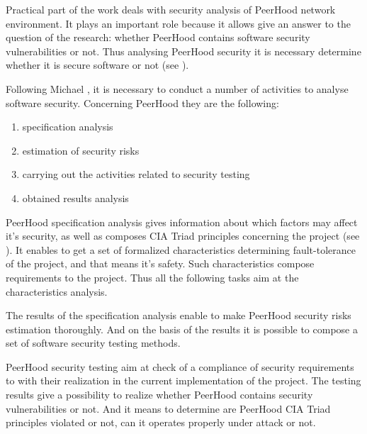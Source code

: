 %
Practical part of the work deals with security analysis of \The PeerHood network environment. 
%
It plays an important role because it allows give an answer to the question of the research: whether PeerHood contains software security vulnerabilities or not. 
%
Thus analysing PeerHood security it is necessary determine whether it is secure software or not (see ). 

%
Following Michael , it is necessary to conduct a number of activities to analyse software security. 
%
Concerning PeerHood they are the following: 
\begin{enumerate}
	\leftskip2em%
	\setlength{\itemsep}{0pt}%
	\setlength{\parsep}{0pt}%

	\item specification analysis
	\item estimation of security risks
	\item carrying out the activities related to security testing
	\item obtained results analysis
\end{enumerate}

%
PeerHood specification analysis gives information about which factors may affect it's security, as well as composes CIA Triad principles concerning the project (see ). 
%
It enables to get a set of formalized characteristics determining fault-tolerance of the project, and that means it's safety. 
%
Such characteristics compose requirements to the project. 
%
Thus all the following tasks aim at the characteristics analysis. 

%
The results of the specification analysis enable to make PeerHood security risks estimation thoroughly. 
%
And on the basis of the results it is possible to compose a set of software security testing methods. 

%
PeerHood security testing aim at check of a compliance of security requirements to with their realization in the current implementation of the project. 
%
The testing results give a possibility to realize whether PeerHood contains security vulnerabilities or not. 
%
And it means to determine are PeerHood CIA Triad principles violated or not, can it operates properly under attack or not. 